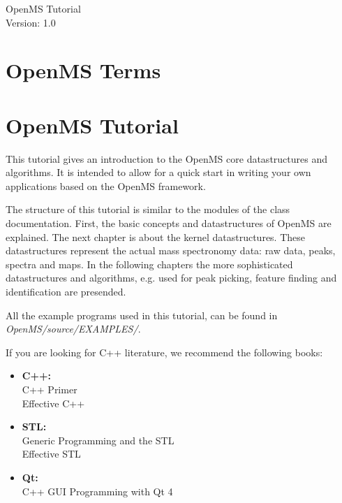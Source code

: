 \documentclass[a4paper]{article}
\begin{document}
\begin{titlepage}
\vspace*{7cm}
\begin{center}
{\Large OpenMS Tutorial\\[1ex]\large Version: 1.0 }\\
\end{center}
\end{titlepage}


\setcounter{tocdepth}{2}
\tableofcontents
\pagebreak

\section{OpenMS Terms}
	
	
	\pagebreak

\section{OpenMS Tutorial}

	This tutorial gives an introduction to the OpenMS core datastructures and algorithms.
	It is intended to allow for a quick start in writing your own applications based on
	the OpenMS framework.
	
	The structure of this tutorial is similar to the modules of the class documentation.
	First, the basic concepts and datastructures of OpenMS are explained. The next chapter is
	about the kernel datastructures. These datastructures represent the actual mass spectronomy
	data: raw data, peaks, spectra and maps. In the following chapters the more sophisticated 
	datastructures and algorithms, e.g. used for peak picking, feature finding and identification
	are presended.
	
	All the example programs used in this tutorial, can be found in {\em OpenMS/source/EXAMPLES/}.

	If you are looking for C++ literature, we recommend the following books:
	\begin{itemize}
		\item {\bf C++:}\\ C++ Primer\\ Effective C++
		\item {\bf STL:}\\ Generic Programming and the STL\\ Effective STL
		\item {\bf Qt:}\\ C++ GUI Programming with Qt 4
	\end{itemize}
	
	\pagebreak
	
	\pagebreak
	
	\pagebreak
	
	\pagebreak
	
	\pagebreak
	
	\pagebreak
	
	\pagebreak
	
	\pagebreak
	
	\pagebreak
	
	\pagebreak
	
\end{document}
